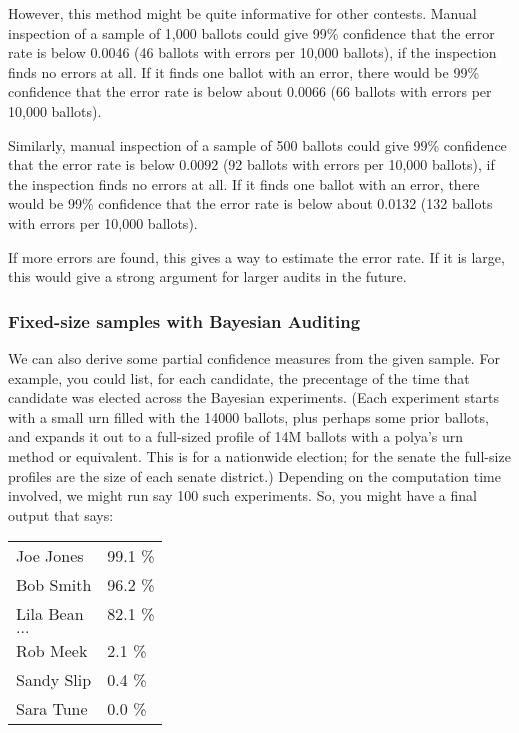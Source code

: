 \documentclass[10pt,a4paper]{article}
\begin{document}
However, this method might be quite informative for other contests.   Manual inspection of a sample of 1,000 ballots could give 99\% confidence that the error rate is below 0.0046 (46 ballots with errors per 10,000 ballots), if the inspection finds no errors at all. If it finds one ballot with an error, there would be 99\% confidence that the error rate is below about 0.0066 (66 ballots with errors per 10,000 ballots).

Similarly, manual inspection of a sample of 500 ballots could give 99\% confidence that the error rate is below 0.0092 (92 ballots with errors per 10,000 ballots), if the inspection finds no errors at all. If it finds one ballot with an error, there would be 99\% confidence that the error rate is below about 0.0132 (132 ballots with errors per 10,000 ballots).

If more errors are found, this gives a way to estimate the error rate.  If it is large, this would give a strong argument for larger audits in the future.




\subsubsection{Fixed-size samples with Bayesian Auditing} 
We can also derive some partial confidence measures from the
given sample.  For example, you could list, for each candidate,
the precentage of the time that candidate was elected across the Bayesian
experiments.  (Each experiment starts with a small urn filled with
the 14000 ballots, plus perhaps some prior ballots, and expands
it out to a full-sized profile of 14M ballots with a polya's urn
method or equivalent.  This is for a nationwide election; for the
senate the full-size profiles are the size of each senate district.)
Depending on the computation time involved, we might run say
100 such experiments.  So, you might have a final output that says:

\begin{tabular}{ll}
Joe Jones    & 99.1 \% \\
Bob Smith    & 96.2 \% \\
Lila Bean      & 82.1 \% \\
$\ldots$    & \\
Rob Meek       & 2.1 \% \\ 
Sandy Slip      & 0.4 \%   \\
Sara Tune       & 0.0 \%   \\
\end{tabular}
\end{document}
